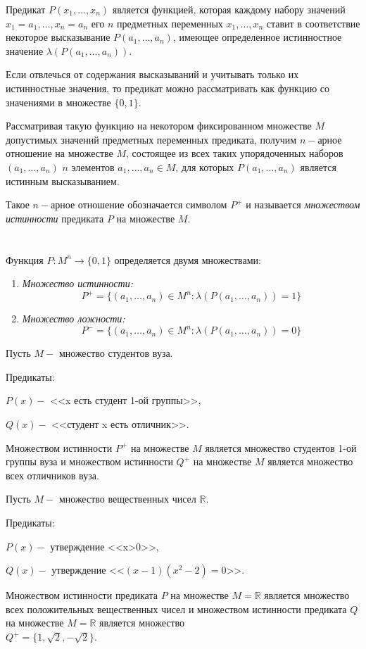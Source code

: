 Предикат $P(x_1,\ldots,x_n)$ является функцией, которая каждому набору значений $x_1=a_1,\ldots,x_n=a_n$ его $n$ предметных переменных $x_1,\ldots,x_n$ ставит в соответствие некоторое высказывание $P(a_1,\ldots,a_n)$, имеющее определенное истинностное значение $\lambda(P(a_1,\ldots,a_n))$.

Если отвлечься от содержания высказываний и учитывать только их истинностные значения, то предикат можно рассматривать как функцию со значениями в множестве $\{0,1\}$.

Рассматривая такую функцию на некотором фиксированном множестве $M$ допустимых значений предметных переменных предиката, получим $n-$арное отношение на множестве $M$, состоящее из всех таких упорядоченных наборов $(a_1,\ldots,a_n)$ $n$ элементов $a_1,\ldots,a_n\in M$, для которых $P(a_1,\ldots,a_n)$ является истинным высказыванием.

Такое $n-$арное отношение обозначается символом $P^+$ и называется \textit{множеством истинности} предиката $P$ на множестве $M$. \\ \\ \\

Функция $P:M^n\rightarrow \{0,1\}$ определяется двумя множествами:

\begin{enumerate}
    \item \textit{Множество истинности: } 
    $$P^+=\{(a_1,\ldots,a_n)\in M^n:\lambda(P(a_1,\ldots,a_n))=1\}$$
    \item \textit{Множество ложности:} $$P^-=\{(a_1,\ldots,a_n)\in M^n:\lambda(P(a_1,\ldots,a_n))=0\}$$
\end{enumerate}

\begin{example}
    Пусть $M - $ множество студентов вуза.

    Предикаты:

    $P(x) - $ <<x есть студент 1-ой группы>>,

    $Q(x) - $ <<студент x есть отличник>>.

    Множеством истинности $P^+$ на множестве $M$ является множество студентов 1-ой группы вуза и множеством истинности $Q^+$ на множестве $M$ является множество всех отличников вуза.
\end{example}

\begin{example}
    Пусть $M - $ множество вещественных чисел $\mathbb{R}$.

    Предикаты:

    $P(x) - $ утверждение <<x>0>>,

    $Q(x) - $ утверждение <<$(x-1)(x^2-2) = 0$>>.

    Множеством истинности предиката $P$ на множестве $M = \mathbb{R}$ является множество всех положительных вещественных чисел и множеством истинности предиката $Q$ на множестве $M = \mathbb{R} $ является множество \\
    $Q^+ = \{1,\sqrt{2},-\sqrt{2}\}$.
\end{example}

